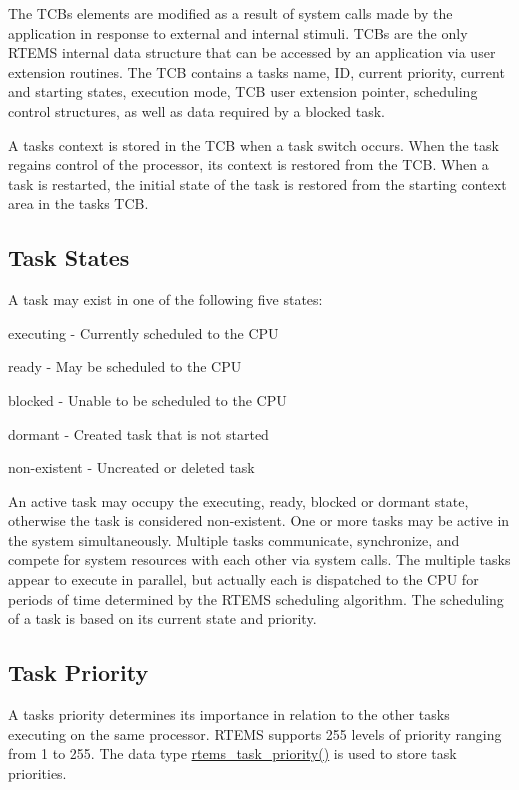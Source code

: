 The T\+CB\textquotesingle{}s elements are modified as a result of system calls made by the application in response to external and internal stimuli. T\+C\+Bs are the only R\+T\+E\+MS internal data structure that can be accessed by an application via user extension routines. The T\+CB contains a task\textquotesingle{}s name, ID, current priority, current and starting states, execution mode, T\+CB user extension pointer, scheduling control structures, as well as data required by a blocked task.

A task\textquotesingle{}s context is stored in the T\+CB when a task switch occurs. When the task regains control of the processor, its context is restored from the T\+CB. When a task is restarted, the initial state of the task is restored from the starting context area in the task\textquotesingle{}s T\+CB.\hypertarget{group__ClassicTasks_ClassicTasksSecTaskStates}{}\subsection{Task States}\label{group__ClassicTasks_ClassicTasksSecTaskStates}
A task may exist in one of the following five states\+:


\begin{DoxyItemize}
\item executing -\/ Currently scheduled to the C\+PU
\item ready -\/ May be scheduled to the C\+PU
\item blocked -\/ Unable to be scheduled to the C\+PU
\item dormant -\/ Created task that is not started
\item non-\/existent -\/ Uncreated or deleted task
\end{DoxyItemize}

An active task may occupy the executing, ready, blocked or dormant state, otherwise the task is considered non-\/existent. One or more tasks may be active in the system simultaneously. Multiple tasks communicate, synchronize, and compete for system resources with each other via system calls. The multiple tasks appear to execute in parallel, but actually each is dispatched to the C\+PU for periods of time determined by the R\+T\+E\+MS scheduling algorithm. The scheduling of a task is based on its current state and priority.\hypertarget{group__ClassicTasks_ClassicTasksSecTaskPriority}{}\subsection{Task Priority}\label{group__ClassicTasks_ClassicTasksSecTaskPriority}
A task\textquotesingle{}s priority determines its importance in relation to the other tasks executing on the same processor. R\+T\+E\+MS supports 255 levels of priority ranging from 1 to 255. The data type \mbox{\hyperlink{group__ClassicTasks_gaa80a0c0938307d1e99d0eb5fee765b47}{rtems\+\_\+task\+\_\+priority()}} is used to store task priorities.

